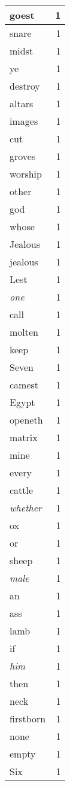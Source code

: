 \begin{center}
\begin{longtable}{l|r}
goest & 1 \\ \hline
snare & 1 \\ \hline
midst & 1 \\ \hline
ye & 1 \\ \hline
destroy & 1 \\ \hline
altars & 1 \\ \hline
images & 1 \\ \hline
cut & 1 \\ \hline
groves & 1 \\ \hline
worship & 1 \\ \hline
other & 1 \\ \hline
god & 1 \\ \hline
whose & 1 \\ \hline
Jealous & 1 \\ \hline
jealous & 1 \\ \hline
Lest & 1 \\ \hline
\emph{one} & 1 \\ \hline
call & 1 \\ \hline
molten & 1 \\ \hline
keep & 1 \\ \hline
Seven & 1 \\ \hline
camest & 1 \\ \hline
Egypt & 1 \\ \hline
openeth & 1 \\ \hline
matrix & 1 \\ \hline
mine & 1 \\ \hline
every & 1 \\ \hline
cattle & 1 \\ \hline
\emph{whether} & 1 \\ \hline
ox & 1 \\ \hline
or & 1 \\ \hline
sheep & 1 \\ \hline
\emph{male} & 1 \\ \hline
an & 1 \\ \hline
ass & 1 \\ \hline
lamb & 1 \\ \hline
if & 1 \\ \hline
\emph{him} & 1 \\ \hline
then & 1 \\ \hline
neck & 1 \\ \hline
firstborn & 1 \\ \hline
none & 1 \\ \hline
empty & 1 \\ \hline
Six & 1 \\ \hline

\end{longtable}
\end{center}
